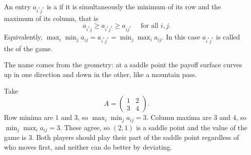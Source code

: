 \begin{definition}
    An entry $a_{i^*j^*}$ is a  if it is simultaneously the minimum of its row and the maximum of its column, that is
    $$
    a_{i^*j} \geq a_{i^*j^*} \geq a_{ij^*} \quad\text{ for all } i, j.
    $$
    Equivalently, $\max_i\min_j a_{ij} = a_{i^*j^*} = \min_j\max_i a_{ij}$. In this case $a_{i^*j^*}$ is called the  of the game.
\end{definition}

The name comes from the geometry: at a saddle point the payoff surface curves up in one direction and down in the other, like a mountain pass.

\begin{center}
\end{center}

\begin{example}
    Take
    $$
    A = \begin{pmatrix}1 & 2\\3&4\end{pmatrix}.
    $$
    Row minima are $1$ and $3$, so $\max_i\min_j a_{ij} = 3$. Column maxima are $3$ and $4$, so $\min_j\max_i a_{ij} = 3$. These agree, so $(2,1)$ is a saddle point and the value of the game is $3$. Both players should play their part of the saddle point regardless of who moves first, and neither can do better by deviating.
\end{example}

